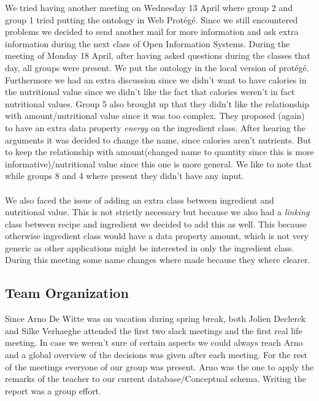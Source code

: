 \noindent
We tried having another meeting on Wednesday 13 April where group 2 and group 1 tried putting the ontology in Web Protégé. Since we still encountered problems we decided to send another mail for more information and ask extra information during the next class of Open Information Systems. 
\newline
\newline
\noindent
During the meeting of Monday 18 April, after having asked questions during the classes that day, all groups were present. We put the ontology in the local version of prot\'eg\'e. Furthermore we had an extra discussion since we didn't want to have calories in the nutritional value since we didn't like the fact that calories weren't in fact nutritional values. Group 5 also brought up that they didn't like the relationship with amount/nutritional value since it was too complex. They proposed (again) to have an extra data property \emph{energy} on the ingredient class. After hearing the arguments it was decided to change the name, since calories aren't nutrients. But to keep the relationship with amount(changed name to quantity since this is more informative)/nutritional value since this one is more general. We like to note that while groups 8 and 4 where present they didn't have any input.\\ \\
We also faced the issue of adding an extra class between ingredient and nutritional value. This is not strictly necessary but because we also had a \emph{linking} class between recipe and ingredient we decided to add this as well. This because otherwise ingredient class would have a data property amount, which is not very generic as other applications might be interested in only the ingredient class. During this meeting some name changes where made because they where clearer.

\subsection{Team Organization}

Since Arno De Witte was on vacation during spring break, both Jolien Declerck and Silke Verhaeghe attended the first two slack meetings and the first real life meeting. In case we weren't sure of certain aspects we could always reach Arno and a global overview of the decisions was given after each meeting. For the rest of the meetings everyone of our group was present. Arno was the one to apply the remarks of the teacher to our current database/Conceptual schema. Writing the report was a group effort. 

